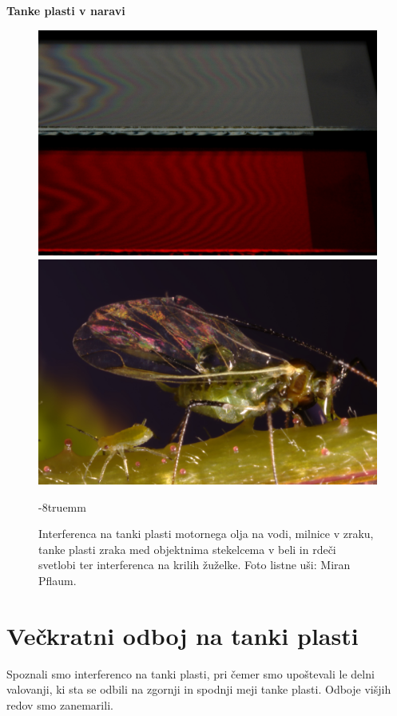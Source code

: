 \begin{example}{\bf Tanke plasti v naravi}
\begin{figure}[!h]
\includegraphics[width=7truecm]{slike/06_photo_zrak.jpg}\hfill
\includegraphics[width=7truecm]{slike/06_photo_us.jpg}
\caption{Interferenca na tanki plasti motornega olja na vodi, 
milnice v zraku, tanke plasti zraka med objektnima stekelcema 
v beli in rdeči svetlobi ter interferenca
na krilih žuželke. Foto listne uši: Miran Pflaum.}
\vglue-8truemm
\label{fig:06_Photos}
\end{figure}

\end{example}

\section{Večkratni odboj na tanki plasti}
Spoznali smo interferenco na tanki plasti, pri čemer
smo upoštevali le delni valovanji, ki sta se odbili na zgornji in 
spodnji meji tanke plasti. Odboje višjih redov smo zanemarili.

